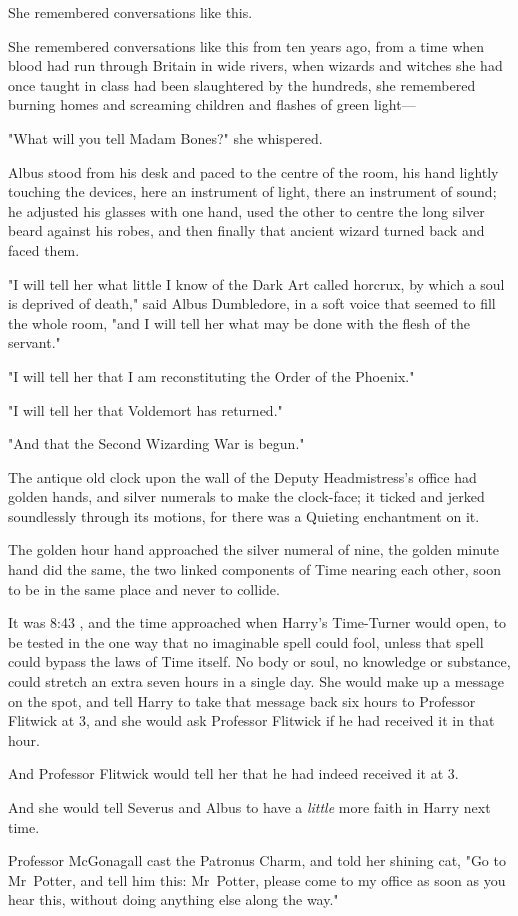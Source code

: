 She remembered conversations like this.

She remembered conversations like this from ten years ago, from a time when
blood had run through Britain in wide rivers, when wizards and witches she had
once taught in class had been slaughtered by the hundreds, she remembered
burning homes and screaming children and flashes of green light---

"What will you tell Madam Bones?" she whispered.

Albus stood from his desk and paced to the centre of the room, his hand lightly
touching the devices, here an instrument of light, there an instrument of
sound; he adjusted his glasses with one hand, used the other to centre the long
silver beard against his robes, and then finally that ancient wizard turned
back and faced them.

"I will tell her what little I know of the Dark Art called horcrux, by which a
soul is deprived of death," said Albus Dumbledore, in a soft voice that seemed
to fill the whole room, "and I will tell her what may be done with the flesh of
the servant."

"I will tell her that I am reconstituting the Order of the Phoenix."

"I will tell her that Voldemort has returned."

"And that the Second Wizarding War is begun."

The antique old clock upon the wall of the Deputy Headmistress's office had
golden hands, and silver numerals to make the clock-face; it ticked and jerked
soundlessly through its motions, for there was a Quieting enchantment on it.

The golden hour hand approached the silver numeral of nine, the golden minute
hand did the same, the two linked components of Time nearing each other, soon
to be in the same place and never to collide.

It was 8:43 \PM, and the time approached when Harry's Time-Turner would open, to
be tested in the one way that no imaginable spell could fool, unless that spell
could bypass the laws of Time itself. No body or soul, no knowledge or
substance, could stretch an extra seven hours in a single day. She would make
up a message on the spot, and tell Harry to take that message back six hours to
Professor Flitwick at 3\PM, and she would ask Professor Flitwick if he had
received it in that hour.

And Professor Flitwick would tell her that he had indeed received it at 3\PM.

And she would tell Severus and Albus to have a \emph{little} more faith in
Harry next time.

Professor McGonagall cast the Patronus Charm, and told her shining cat, "Go to
Mr~Potter, and tell him this: Mr~Potter, please come to my office as soon as
you hear this, without doing anything else along the way."
